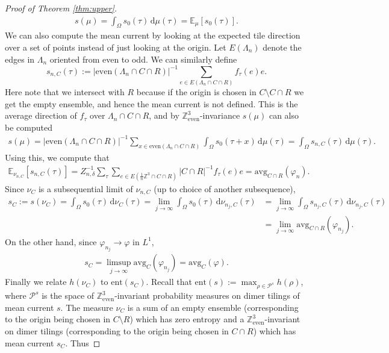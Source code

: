 \documentclass[11pt]{article}
\theoremstyle{remark}
\theoremstyle{definition}
\newcommand{\Z}{\mathbb{Z}}
\newcommand{\ent}{\text{ent}}
\newcommand{\threeeven}{\Z^3_{\text{even}}}
\newcommand{\mc}[1]{\mathcal{#1}}
\newcommand{\m}[1]{\mathbb{#1}}
\newcommand{\dd}{\mathrm{d}}
\begin{document}
\begin{proof}[Proof of Theorem \ref{thm:upper}]
\begin{align*}
    s(\mu) = \int_{\Omega} s_0(\tau)\, \dd \mu(\tau) = \m E_{\mu}[s_0(\tau)].
\end{align*}
We can also compute the mean current by looking at the expected tile direction over a set of points instead of just looking at the origin. Let $E(\Lambda_n)$ denote the edges in $\Lambda_n$ oriented from even to odd. We can similarly define 
$$s_{n,C}(\tau) := |\text{even}(\Lambda_n\cap C\cap R)|^{-1} \sum_{e\in E(\Lambda_n\cap C\cap R)} f_\tau(e)e.$$ 
Here note that we intersect with $R$ because if the origin is chosen in $C\setminus C\cap R$ we get the empty ensemble, and hence the mean current is not defined. This is the average direction of $f_\tau$ over $\Lambda_n\cap C\cap R$, and by $\threeeven$-invariance $s(\mu)$ can also be computed 
\begin{align*}
    s(\mu) = |\text{even}(\Lambda_n\cap C\cap R)|^{-1} \sum_{x\in \text{even}(\Lambda_n\cap C\cap R)} \int_{\Omega} s_0(\tau+x) \,  \dd\mu(\tau) = \int_{\Omega} s_{n,C}(\tau)\, \dd \mu(\tau). 
\end{align*}
Using this, we compute that 
\begin{align*}    \m E_{\nu_{n,C}}[s_{n,C}(\tau)] = Z_{n,\delta}^{-1}  \sum_{\tau} \sum_{e\in E(\frac{1}{n} \m Z^3\cap C\cap R)} |C\cap R|^{-1} f_\tau(e)e = \text{avg}_{C\cap R}(\varphi_n).
\end{align*}
Since $\nu_C$ is a subsequential limit of $\nu_{n,C}$ (up to choice of another subsequence),
\begin{align*}
    s_C:= s(\nu_C) = \int_{\Omega} s_0(\tau) \,\dd \nu_C(\tau)= 
    \lim_{j\to \infty}
    \int_{\Omega} s_0(\tau) \,\dd \nu_{n_j,C}(\tau)&=\lim_{j\to \infty}
    \int_{\Omega} s_{n_j,C}(\tau) \,\dd \nu_{n_j,C}(\tau)
    \\
    &=\lim_{j\to \infty} \text{avg}_{C\cap R}(\varphi_{n_j}).
\end{align*}
On the other hand, since $\varphi_{n_j}\to \varphi$ in $L^1$, 
\begin{align*}
    s_{C} = \limsup_{j\to\infty} \text{avg}_C(\varphi_{n_j}) = \text{avg}_C(\varphi). 
\end{align*}
Finally we relate $h(\nu_C)$ to $\ent(s_C)$. Recall that $\ent(s):=\max_{\rho\in \mc P^s} h(\rho)$, where $\mc P^s$ is the space of $\threeeven$-invariant probability measures on dimer tilings of mean current $s$. The measure $\nu_C$ is a sum of an empty ensemble (corresponding to the origin being chosen in $C\setminus R$) which has zero entropy and a $\threeeven$-invariant on dimer tilings (corresponding to the origin being chosen in $C\cap R$) which has mean current $s_C$. Thus

\end{proof}
\end{document}
